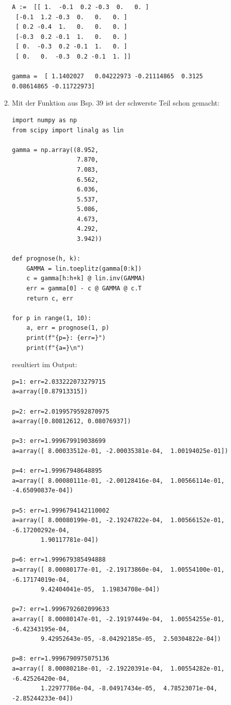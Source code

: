 \documentclass[a4paper,11pt,notitlepage,fullpage]{article}
\begin{document}
\begin{enumerate}
\begin{verbatim}
A :=  [[ 1.  -0.1  0.2 -0.3  0.   0. ]
 [-0.1  1.2 -0.3  0.   0.   0. ]      
 [ 0.2 -0.4  1.   0.   0.   0. ]      
 [-0.3  0.2 -0.1  1.   0.   0. ]      
 [ 0.  -0.3  0.2 -0.1  1.   0. ]
 [ 0.   0.  -0.3  0.2 -0.1  1. ]]

gamma =  [ 1.1402027   0.04222973 -0.21114865  0.3125      0.08614865 -0.11722973]
\end{verbatim}


\item Mit der Funktion aus Bsp. 39 ist der schwerste Teil schon gemacht:
\begin{verbatim}
import numpy as np
from scipy import linalg as lin

gamma = np.array((8.952,
                  7.870,
                  7.083,
                  6.562,
                  6.036,
                  5.537,
                  5.086,
                  4.673,
                  4.292,
                  3.942))

def prognose(h, k):
    GAMMA = lin.toeplitz(gamma[0:k])
    c = gamma[h:h+k] @ lin.inv(GAMMA)
    err = gamma[0] - c @ GAMMA @ c.T
    return c, err

for p in range(1, 10):
    a, err = prognose(1, p)
    print(f"{p=}: {err=}")
    print(f"{a=}\n")
\end{verbatim}
resultiert im Output:
\begin{verbatim}
p=1: err=2.033222073279715
a=array([0.87913315])

p=2: err=2.0199579592870975
a=array([0.80812612, 0.08076937])

p=3: err=1.999679919038699
a=array([ 8.00033512e-01, -2.00035381e-04,  1.00194025e-01])

p=4: err=1.99967948648895
a=array([ 8.00080111e-01, -2.00128416e-04,  1.00566114e-01, -4.65090837e-04])

p=5: err=1.9996794142110002
a=array([ 8.00080199e-01, -2.19247822e-04,  1.00566152e-01, -6.17200292e-04,
        1.90117781e-04])

p=6: err=1.999679385494888
a=array([ 8.00080177e-01, -2.19173860e-04,  1.00554100e-01, -6.17174019e-04,
        9.42404041e-05,  1.19834708e-04])

p=7: err=1.9996792602099633
a=array([ 8.00080147e-01, -2.19197449e-04,  1.00554255e-01, -6.42343195e-04,
        9.42952643e-05, -8.04292185e-05,  2.50304822e-04])

p=8: err=1.9996790975075136
a=array([ 8.00080218e-01, -2.19220391e-04,  1.00554282e-01, -6.42526420e-04,
        1.22977786e-04, -8.04917434e-05,  4.78523071e-04, -2.85244233e-04])


\end{verbatim}
\end{enumerate}
\end{document}

